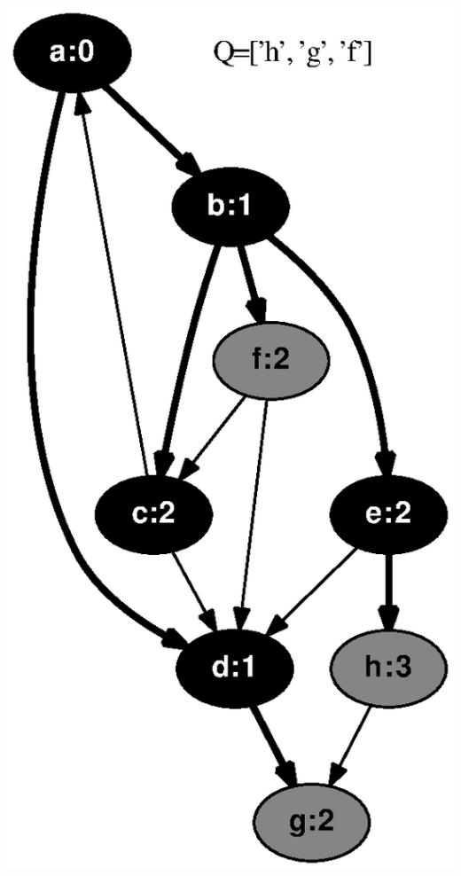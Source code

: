 \documentclass{article}
\begin{document}
\includegraphics[height=.3\textheight]{bfs_directed_classroom_05.eps}
\vspace{1em}
\end{document}
